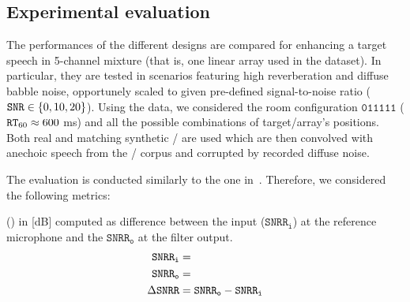 

\subsection{Experimental evaluation}
The performances of the different designs are compared for enhancing a target speech in 5-channel mixture (that is, one linear array used in the \dEchorate{} dataset).
In particular, they are tested in scenarios featuring high reverberation and diffuse babble noise, opportunely scaled to given pre-defined signal-to-noise ratio ($\SNR \in \kbrace{0, 10, 20}$).
Using the \dEchorate{} data, we considered the room configuration $\mathtt{011111}$ ($\mathtt{RT}_{60} \approx 600 $ ms) and all the possible combinations of target/array's positions.
Both real and matching synthetic \RIRs/ are used which are then convolved with anechoic speech from the \WSJ/ corpus and corrupted by recorded diffuse noise.

\mynewline
The evaluation is conducted similarly to the one in~.
Therefore, we considered the following metrics:


 (\DSNRR) in [dB] computed as difference between the input ($\mathtt{SNRR}_\mathtt{i}$) at the reference microphone and the $\mathtt{SNRR}_\mathtt{o}$ at the filter output.
    \begin{equation}
        \begin{aligned}
            \mathtt{SNRR}_\mathtt{i} &=\\
            \mathtt{SNRR}_\mathtt{o}&=\\
            \Delta\mathtt{SNRR} &= \mathtt{SNRR}_\mathtt{o} - \mathtt{SNRR}_\mathtt{i}
        \end{aligned}
    \end{equation}

